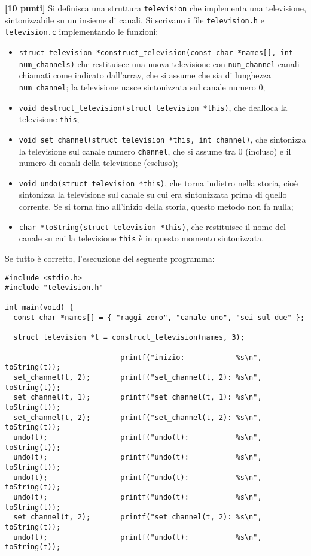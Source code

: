 \documentclass{article}[10pt]
\newcounter{esnu}
\newenvironment{esercizio}{\medskip \noindent {\bf Esercizio\addtocounter{esnu}{1} \arabic{esnu}}}{}
\begin{document}
\begin{esercizio}
\textbf{[10 punti]}
%
Si definisca una struttura \texttt{television} che implementa una televisione, sintonizzabile
su un insieme di canali.
Si scrivano i file \texttt{television.h} e \texttt{television.c} implementando le funzioni:
%
\begin{itemize}
\item \texttt{struct television *construct\_television(const char *names[], int num\_channels)} che resti\-tui\-sce una
      nuova televisione con \texttt{num\_channel} canali chiamati come indicato dall'array, che si assume che sia
      di lunghezza \texttt{num\_channel}; la televisione nasce sintonizzata sul canale numero 0;
\item \texttt{void destruct\_television(struct television *this)}, che dealloca la televisione \texttt{this};
\item \texttt{void set\_channel(struct television *this, int channel)}, che sintonizza la televisione sul canale
      numero \texttt{channel}, che si assume tra 0 (incluso) e il numero di canali della televisione (escluso);
\item \texttt{void undo(struct television *this)}, che torna indietro nella storia, cio\`e
      sintonizza la televisione sul canale su cui era sintonizzata
      prima di quello corrente. Se si torna fino all'inizio della storia, questo metodo non fa nulla;
\item \texttt{char *toString(struct television *this)}, che restituisce il nome del canale su cui
      la televisione \texttt{this} \`e in questo momento sintonizzata.
\end{itemize}
%
Se tutto \`e corretto, l'esecuzione del seguente programma:

{\small
\begin{verbatim}
#include <stdio.h>
#include "television.h"

int main(void) {
  const char *names[] = { "raggi zero", "canale uno", "sei sul due" };

  struct television *t = construct_television(names, 3);

                           printf("inizio:            %s\n", toString(t));
  set_channel(t, 2);       printf("set_channel(t, 2): %s\n", toString(t));
  set_channel(t, 1);       printf("set_channel(t, 1): %s\n", toString(t));
  set_channel(t, 2);       printf("set_channel(t, 2): %s\n", toString(t));
  undo(t);                 printf("undo(t):           %s\n", toString(t));
  undo(t);                 printf("undo(t):           %s\n", toString(t));
  undo(t);                 printf("undo(t):           %s\n", toString(t));
  undo(t);                 printf("undo(t):           %s\n", toString(t));
  set_channel(t, 2);       printf("set_channel(t, 2): %s\n", toString(t));
  undo(t);                 printf("undo(t):           %s\n", toString(t));


\end{verbatim}}
\end{esercizio}
\end{document}
